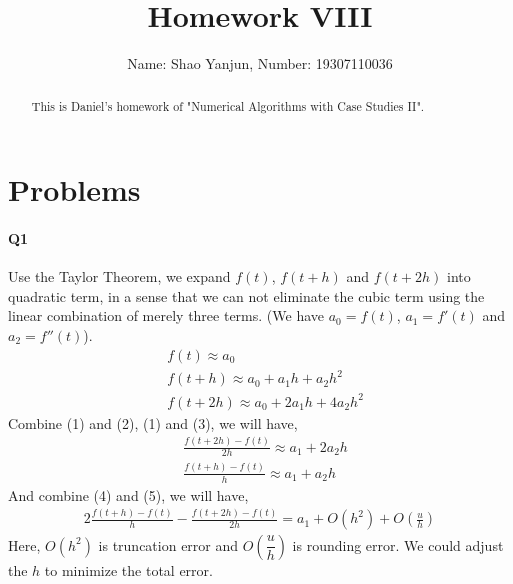 \documentclass[11pt]{article}
\title{Homework VIII}
\author{Name: Shao Yanjun, Number: 19307110036}
\begin{document}
\maketitle

\begin{abstract}
This is Daniel's homework of  "Numerical Algorithms with Case Studies II".
\end{abstract}
\section{Problems}
\paragraph{Q1}
Use the Taylor Theorem, we expand $f(t)$, $f(t+h)$ and $f(t+2h)$ into quadratic term, in a sense that we can not eliminate the cubic term using the linear combination of merely three terms. (We have $a_0=f(t)$, $a_1=f'(t)$ and $a_2=f''(t)$).
\begin{align}
	&f(t)\approx a_0\\
	&f(t+h)\approx a_0+a_1h+a_2h^2\\
	&f(t+2h)\approx a_0+2a_1h+4a_2h^2
\end{align}
Combine (1) and (2), (1) and (3), we will have,
\begin{align}
	&\frac{f(t+2h)-f(t)}{2h}\approx a_1+2a_2h\\
	&\frac{f(t+h)-f(t)}{h}\approx a_1+a_2h
\end{align}
And combine (4) and (5), we will have,
\begin{align}
	2\frac{f(t+h)-f(t)}{h}-\frac{f(t+2h)-f(t)}{2h}=a_1+O(h^2)+O(\frac{u}{h})
\end{align}
Here, $O(h^2)$ is truncation error and $O(\dfrac{u}{h})$ is rounding error. We could adjust the $h$ to minimize the total error.
\end{document}

